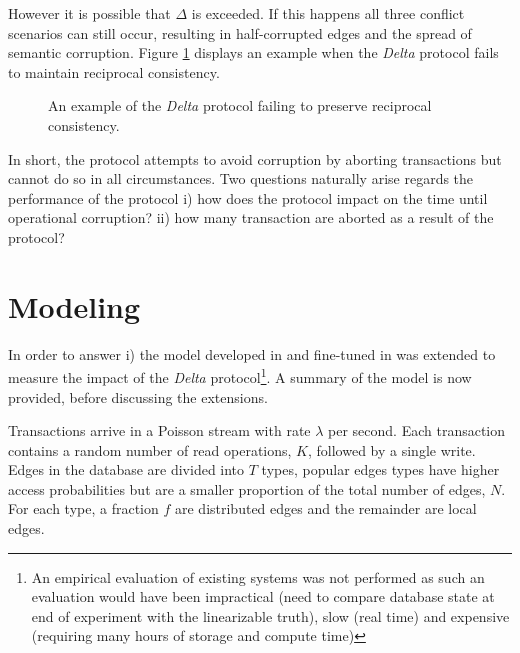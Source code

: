 \documentclass[sigplan,10pt]{acmart}
\begin{document}
However it is possible that $\Delta$ is exceeded. If this happens all three conflict scenarios can still occur, resulting in half-corrupted edges and the spread of semantic corruption. Figure \ref{corruption-again} displays an example when the \emph{Delta} protocol fails to maintain reciprocal consistency.

\begin{figure}[H]
  \centering
  \caption{An example of the \emph{Delta} protocol failing to preserve reciprocal consistency.}
  \label{corruption-again}
\end{figure}

In short, the protocol attempts to avoid corruption by aborting transactions but cannot do so in all circumstances. Two questions naturally arise regards the performance of the protocol i) how does the protocol impact on the time until operational corruption? ii) how many transaction are aborted as a result of the protocol?

\section{Modeling}
\label{sec:modeling}

In order to answer i) the model developed in \cite{Ezhilchelvan2018} and fine-tuned in \cite{Webber2019} was extended to measure the impact of the \emph{Delta} protocol\footnote{An empirical evaluation of existing systems was not performed as such an evaluation would have been impractical (need to compare database state at end of experiment with the linearizable truth), slow (real time) and expensive (requiring many hours of storage and compute time)}. A summary of the model is now provided, before discussing the extensions.

Transactions arrive in a Poisson stream with rate $\lambda$ per second. Each transaction contains a random number of read operations, $K$, followed by a single write. Edges in the database are divided into $T$ types, popular edges types have higher access probabilities but are a smaller proportion of the total number of edges, $N$. For each type, a fraction $f$ are distributed edges and the remainder are local edges.
\end{document}
